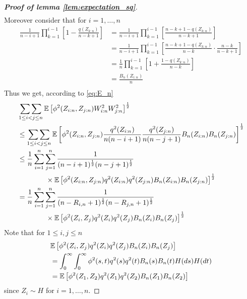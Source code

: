 \begin{proof}[\textbf{Proof of lemma \ref{lem:expectation_sq}}]
\begin{align*}
	\end{align*}
	Moreover consider that for $i=1,\dots,n$
	\begin{align*}
		\frac{1}{n-i+1}\prod_{k=1}^{i-1}\left[1-\frac{q(Z_{k:n})}{n-k+1}\right]
		&=  \frac{1}{n-i+1}\prod_{k=1}^{i-1}\left[\frac{n-k+1-q(Z_{k:n})}{n-k+1}\right] \\
		&=  \frac{1}{n-i+1}\prod_{k=1}^{i-1}\left[\frac{n-k+1-q(Z_{k:n})}{n-k} \cdot \frac{n-k}{n-k+1}\right]\\
		&=  \frac{1}{n}\prod_{k=1}^{i-1}\left[1+\frac{1-q(Z_{k:n})}{n-k}\right]\\
		&=  \frac{B_n(Z_{i:n})}{n}\\
	\end{align*}
	Thus we get, according to \eqref{eq:E_n}
	\begin{align*}
		&\mathop{\sum\sum}\limits_{1\leq i<j\leq n}\mathbb{E}\left[\phi^2(Z_{i:n}, Z_{j:n}) W^2_{i:n} W^2_{j:n}\right]^{\frac{1}{2}}\\
		&\leq \mathop{\sum\sum}\limits_{1\leq i<j\leq n}\mathbb{E}\left[\phi^2(Z_{i:n}, Z_{j:n}) \frac{q^2(Z_{i:n})}{n(n-i+1)}\frac{q^2(Z_{j:n})}{n(n-j+1)} B_n(Z_{i:n})B_n(Z_{j:n})\right]^\frac{1}{2}\\
		&\leq \frac{1}{n}\sum_{i=1}^{n}\sum_{j=1}^{n}\frac{1}{(n-i+1)^\frac{1}{2}(n-j+1)^\frac{1}{2}}\\
		&\qquad\qquad\times \mathbb{E}\left[\phi^2(Z_{i:n}, Z_{j:n}) q^2(Z_{i:n})q^2(Z_{j:n}) B_n(Z_{i:n})B_n(Z_{j:n})\right]^\frac{1}{2}\\
		&= \frac{1}{n}\sum_{i=1}^{n}\sum_{j=1}^{n} \frac{1}{(n-R_{i,n}+1)^{\frac{1}{2}} (n-R_{j,n}+1)^{\frac{1}{2}}}\\
		&\qquad\qquad \times \mathbb{E}\left[\phi^2(Z_{i}, Z_{j}) q^2(Z_{i})q^2(Z_{j})B_n(Z_{i})B_n(Z_{j})\right]^{\frac{1}{2}}
	\end{align*}
	Note that for $1\leq i,j \leq n$
	\begin{align*}
		&\mathbb{E}\left[\phi^2(Z_{i}, Z_{j}) q^2(Z_{i})q^2(Z_{j})B_n(Z_{i})B_n(Z_{j})\right]\\
		&= \int_{0}^{\infty} \int_{0}^{\infty} \phi^2(s,t) q^2(s) q^2(t) B_n(s)B_n(t) H(ds)H(dt)\\
		&= \mathbb{E}\left[\phi^2(Z_{1}, Z_{2}) q^2(Z_{1})q^2(Z_{2})B_n(Z_{1})B_n(Z_{2})\right]
	\end{align*}
	since $Z_i \sim H$ for $i=1,\dots,n$.

\end{proof}
